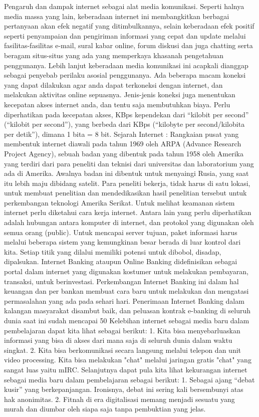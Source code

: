 \documentclass[12pt, a4paper]{article}
\begin{document}
    Pengaruh dan dampak internet sebagai alat media komunikasi. Seperti halnya media massa yang lain, keberadaan internet ini membangkitkan berbagai pertanyaan akan efek negatif yang ditimbulkannya, selain keberadaan efek positif seperti penyampaian dan pengiriman informasi yang cepat dan update melalui fasilitas-fasilitas e-mail, sural kabar online, forum diskusi dan juga chatting serta beragam situs-situs yang ada yang memperkaya khasanah pengetahuan penggunanya. Lebih lanjut keberadaan media komunikasi ini acapkali dianggap sebagai penyebab perilaku asosial penggunanya.
    Ada beberapa macam koneksi yang dapat dilakukan agar anda dapat terkoneksi dengan internet, dan melakukan aktivitas online sepuasnya. Jenis-jenis koneksi juga menentukan kecepatan akses internet anda, dan tentu saja membutuhkan biaya. Perlu diperhatikan pada kecepatan akses, KBps kependekan dari “kilobit per second” (“kilobit per second”), yang berbeda dari KBps (“kilobyte per second/kilobita per detik”), dimana 1 bita = 8 bit.
    Sejarah Internet : Rangkaian pusat yang membentuk internet diawali pada tahun 1969 oleh ARPA (Advance Research Project Agency), sebuah badan yang dibentuk pada tahun 1958 oleh Amerika yang terdiri dari para peneliti dan teknisi dari universitas dan laboratorium yang ada di Amerika. Awalnya badan ini dibentuk untuk menyaingi Rusia, yang saat itu lebih maju dibidang satelit. Para peneliti bekerja, tidak harus di satu lokasi, untuk membuat penelitian dan mendedikasikan hasil penelitian tersebut untuk perkembangan teknologi Amerika Serikat.
    Untuk melihat keamanan sistem internet perlu diketahui cara kerja internet. Antara lain yang perlu diperhatikan adalah hubungan antara komputer di internet, dan protokol yang digunakan oleh semua orang (public). Untuk mencapai server tujuan, paket informasi harus melalui beberapa sistem yang kemungkinan besar berada di luar kontrol dari kita. Setiap titik yang dilalui memiliki potensi untuk dibobol, disadap, dipalsukan.
    Internet Banking ataupun Online Banking didefinisikan sebagai portal dalam internet yang digunakan kostumer untuk melakukan pembayaran, transaksi, untuk berinvestasi. Perkembangan Internet Banking ini dalam hal keuangan dan per bankan membuat cara baru untuk melakukan dan mengatasi permasalahan yang ada pada sehari hari. Penerimaan Internet Banking dalam kalangan masyarakat disambut baik, dan peluasan kontrak e-banking di seluruh dunia saat ini sudah mencapai 50%
    Kelebihan internet sebagai media baru dalam pembelajaran dapat kita lihat sebagai berikut:
1. Kita bisa menyebarluaskan informasi yang bisa di akses dari mana saja di seluruh dunia dalam waktu singkat.
2. Kita bisa berkomunikasi secara langsung melalui telepon dan unit video processing. Kita bisa melakukan "chat" melalui jaringan gratis "chat" yang sangat luas yaitu mIRC.
    Selanjutnya dapat pula kita lihat kekurangan internet sebagai media baru dalam pembelajaran  sebagai berikut:
1. Sebagai ajang “debat kusir” yang berkepanjangan. Ironisnya, debat ini sering kali bersembunyi atas hak anonimitas.
2. Fitnah di era digitalisasi memang menjadi sesuatu yang murah dan diumbar oleh siapa saja tanpa pembuktian yang jelas.
\end{document}
